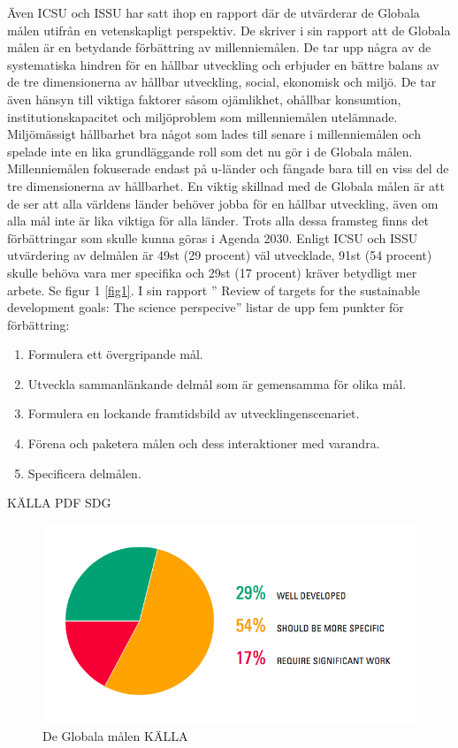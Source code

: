 \documentclass{report}
\begin{document}
Även ICSU och ISSU har satt ihop en rapport där de utvärderar de Globala målen utifrån en vetenskapligt perspektiv. De skriver i sin rapport att de Globala målen är en betydande förbättring av millenniemålen.  De tar upp några av de systematiska hindren för en hållbar utveckling och erbjuder en bättre balans av de tre dimensionerna av hållbar utveckling, social, ekonomisk och miljö. De tar även hänsyn till viktiga faktorer såsom ojämlikhet, ohållbar konsumtion, institutionskapacitet och miljöproblem som millenniemålen utelämnade. Miljömässigt hållbarhet bra något som lades till senare i millenniemålen och spelade inte en lika grundläggande roll som det nu gör i de Globala målen. Millenniemålen fokuserade endast på u-länder och fångade bara till en viss del de tre dimensionerna av hållbarhet. En viktig skillnad med de Globala målen är att de ser att alla världens länder behöver jobba för en hållbar utveckling, även om alla mål inte är lika viktiga för alla länder. Trots alla dessa framsteg finns det förbättringar som skulle kunna göras i Agenda 2030. Enligt ICSU och ISSU utvärdering av delmålen är 49st (29 procent) väl utvecklade, 91st (54 procent) skulle behöva vara mer specifika och 29st (17 procent) kräver betydligt mer arbete. Se figur 1 \ref{fig1}. 
I sin rapport ” Review of targets for the sustainable development goals: The science perspecive” listar de upp fem punkter för förbättring:  

\begin{enumerate}
\item Formulera ett övergripande mål.
\label{improvment1}
\item Utveckla sammanlänkande delmål som är gemensamma för olika mål. 
\label{improvment2}
 \item Formulera en lockande framtidsbild av utvecklingenscenariet.
 \label{improvment3} 
\item Förena och paketera målen och dess interaktioner med varandra. \label{improvment4}
\item Specificera delmålen.
\label{improvment5}
\end{enumerate} 
KÄLLA PDF SDG\\

\begin{figure}[h] \label{fig1}
\label{improvments}
\includegraphics[width=\linewidth]{improvments.png}
\caption{De Globala målen KÄLLA} 
\end{figure}
\end{document}
